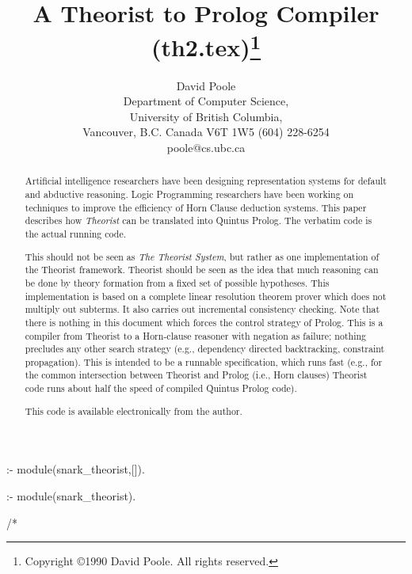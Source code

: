 
:- module(snark_theorist,[]).

:- module(snark_theorist).

/* 
\pagestyle{myheadings}
\makeindex
\newtheorem{example}{Example}
\newtheorem{algorithm}{Algorithm}
\newtheorem{theorem}{Theorem}
\newtheorem{lemma}[theorem]{Lemma}
\newtheorem{definition}{Definition}
\newtheorem{corollary}[theorem]{Corollary}
\newenvironment{proof}{\begin{quote} {\bf Proof: }}{$\Box$\end{quote}}
\newenvironment{prolog}{\begin{tabbing} \hbox{2cm}\=\hbox{1cm}\=\kill
    }{\end{tabbing}}
\newcommand{\IF}{\ $:-$\\\>}
\newcommand{\AND}{,\\\>}
\title{A Theorist to Prolog Compiler (th2.tex)\thanks{Copyright \copyright 1990
David Poole. All rights reserved.}}
\author{David Poole\\
Department of Computer Science,\\
University of British Columbia,\\
Vancouver, B.C. Canada V6T 1W5
(604) 228-6254\\
poole@cs.ubc.ca}

\maketitle
\begin{abstract}
Artificial intelligence researchers have been designing representation
systems for default and abductive reasoning.
Logic Programming researchers have been working on techniques to improve
the efficiency of Horn Clause deduction systems.
This paper describes how {\em Theorist\/} can be
translated into Quintus Prolog.
The verbatim code is the actual running code.

This should not be seen as {\em The Theorist System}, but rather
as one implementation of the Theorist framework. Theorist should be
seen as the idea that much reasoning can be done by theory formation
from a fixed set of possible hypotheses.
This implementation is based on a complete linear resolution theorem prover
which does not multiply out subterms. It also carries out incremental
consistency checking.
Note that there is nothing in this document which forces the control strategy
of Prolog. This is a compiler from Theorist to a Horn-clause reasoner
with negation as failure; nothing precludes any other search strategy
(e.g., dependency directed backtracking, constraint propagation).
This is intended to be a runnable specification, which runs fast
(e.g., for the common intersection between Theorist and Prolog (i.e., Horn
clauses) Theorist code runs about half the speed of compiled Quintus
Prolog code).

This code is available electronically from the author.
\end{abstract}
\tableofcontents
